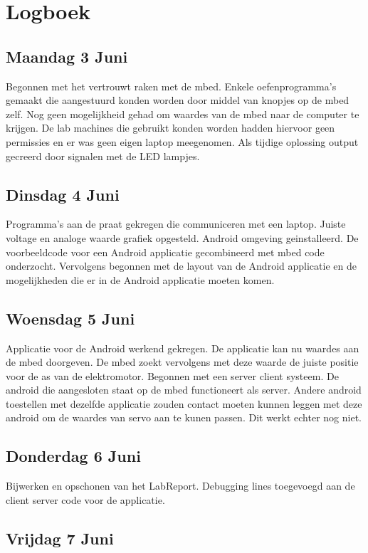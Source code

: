 \documentclass[a4paper]{article}
\begin{document}
	\section{Logboek}
		\subsection{Maandag 3 Juni}
			Begonnen met het vertrouwt raken met de mbed. Enkele oefenprogramma's gemaakt die aangestuurd konden worden door middel van knopjes op de mbed zelf. Nog geen mogelijkheid gehad om waardes van de mbed naar de computer te krijgen. De lab machines die gebruikt konden worden hadden hiervoor geen permissies en er was geen eigen laptop meegenomen. Als tijdige oplossing output gecreerd door signalen met de LED lampjes.
		\subsection{Dinsdag 4 Juni}
			Programma's aan de praat gekregen die communiceren met een laptop. Juiste voltage en analoge waarde grafiek opgesteld. Android omgeving geinstalleerd. De voorbeeldcode voor een Android applicatie gecombineerd met mbed code onderzocht. Vervolgens begonnen met de layout van de Android applicatie en de mogelijkheden die er in de Android applicatie moeten komen.
		\subsection{Woensdag 5 Juni}
			Applicatie voor de Android werkend gekregen. De applicatie kan nu waardes aan de mbed doorgeven. De mbed zoekt vervolgens met deze waarde de juiste positie voor de as van de elektromotor. Begonnen met een server client systeem. De android die aangesloten staat op de mbed functioneert als server. Andere android toestellen met dezelfde applicatie zouden contact moeten kunnen leggen met deze android om de waardes van servo aan te kunen passen. Dit werkt echter nog niet.
		\subsection{Donderdag 6 Juni}
			Bijwerken en opschonen van het LabReport. Debugging lines toegevoegd aan de client server code voor de applicatie.
		\subsection{Vrijdag 7 Juni}
	
\end{document}
